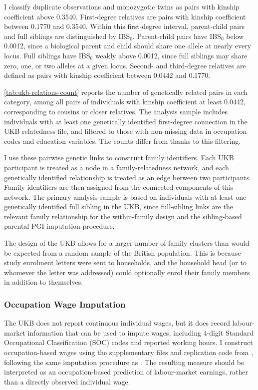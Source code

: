 I classify duplicate observations and monozygotic twins as pairs with kinship coefficient above 0.3540.
First-degree relatives are pairs with kinship coefficient between 0.1770 and 0.3540.
Within this first-degree interval, parent-child pairs and full siblings are distinguished by IBS$_0$.
Parent-child pairs have IBS$_0$ below 0.0012, since a biological parent and child should share one allele at nearly every locus.
Full siblings have IBS$_0$ weakly above 0.0012, since full siblings may share zero, one, or two alleles at a given locus.
Second- and third-degree relatives are defined as pairs with kinship coefficient between 0.0442 and 0.1770.

\autoref{tab:ukb-relations-count} reports the number of genetically related pairs in each category, among all pairs of individuals with kinship coefficient at least 0.0442, corresponding to cousins or closer relatives.
The analysis sample includes individuals with at least one genetically identified first-degree connection in the UKB relatedness file, and filtered to those with non-missing data in occupation codes and education variables.
The counts differ from \citet{muslimova2025environment} thanks to this filtering.

I use these pairwise genetic links to construct family identifiers. Each UKB participant is treated as a node in a family-relatedness network, and each genetically identified relationship is treated as an edge between two participants. Family identifiers are then assigned from the connected components of this network. The primary analysis sample is based on individuals with at least one genetically identified full sibling in the UKB, since full-sibling links are the relevant family relationship for the within-family design and the sibling-based parental PGI imputation procedure.

The design of the UKB allows for a larger number of family clusters than would be expected from a random sample of the British population.
This is because study enrolment letters were sent to households, and the household head (or to whomever the letter was addressed) could optionally enrol their family members in addition to themselves.

\subsubsection{Occupation Wage Imputation}
\label{appendix:pgi-impute}

The UKB does not report continuous individual wages, but it does record labour-market information that can be used to impute wages, including 4-digit Standard Occupational Classification (SOC) codes and reported working hours.
I construct occupation-based wages using the supplementary files and replication code from \cite{kweon2025associations}, following the same imputation procedure as \citet{carvalho2024genetics}.
The resulting measure should be interpreted as an occupation-based prediction of labour-market earnings, rather than a directly observed individual wage.


